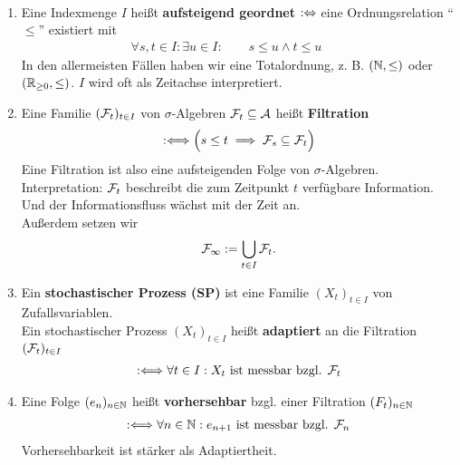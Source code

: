 \begin{defi}\
	\begin{enumerate}[label=(\alph*)]
		\item Eine Indexmenge $I$ heißt \textbf{aufsteigend geordnet} $:\Leftrightarrow$ eine Ordnungsrelation ``$\leq$'' existiert mit
		\begin{align*}
			\forall s,t\in I:\exists u\in I:\qquad s\leq u\wedge t\leq u\qquad 
		\end{align*}
		In den allermeisten Fällen haben wir eine Totalordnung, z. B. $(\mathbb{N},\leq)$ oder $(\mathbb{R}_{\geq0},\leq)$. $I$ wird oft als Zeitachse interpretiert.
		\item Eine Familie $(\mathcal{F}_t)_{t\in I}$ von $\sigma$-Algebren $\mathcal{F}_t\subseteq\mathcal{A}$ heißt \textbf{Filtration} 
		\begin{align*}
			:\Longleftrightarrow\Big( s\leq t\implies\mathcal{F}_s\subseteq\mathcal{F}_t\Big)
		\end{align*}
		Eine Filtration ist also eine aufsteigenden Folge von $\sigma$-Algebren.\\
		Interpretation: $\mathcal{F}_t$ beschreibt die zum Zeitpunkt $t$ verfügbare Information. Und der Informationsfluss wächst mit der Zeit an.\\
		Außerdem setzen wir
		\begin{align*}
			\mathcal{F}_\infty:=\bigcup\limits_{t\in I}\mathcal{F}_t.
		\end{align*}
		\item Ein \textbf{stochastischer Prozess (SP)} ist eine Familie $(X_t)_{t\in I}$ von Zufallsvariablen.\\
		Ein stochastischer Prozess $(X_t)_{t\in I}$ heißt \textbf{adaptiert} an die Filtration $(\mathcal{F}_t)_{t\in I}$
		\begin{align*}
			:\Longleftrightarrow\forall t\in I: X_t\text{ ist messbar bzgl. }\mathcal{F}_t
		\end{align*}
		\item Eine Folge $(e_n)_{n\in\mathbb{N}}$ heißt \textbf{vorhersehbar} bzgl. einer Filtration $(F_t)_{n\in\mathbb{N}}$
		\begin{align*}
			:\Longleftrightarrow\forall n\in\mathbb{N}:e_{n+1}\text{ ist messbar bzgl. }\mathcal{F}_n
		\end{align*}
		Vorhersehbarkeit ist stärker als Adaptiertheit.
	\end{enumerate}
\end{defi}

